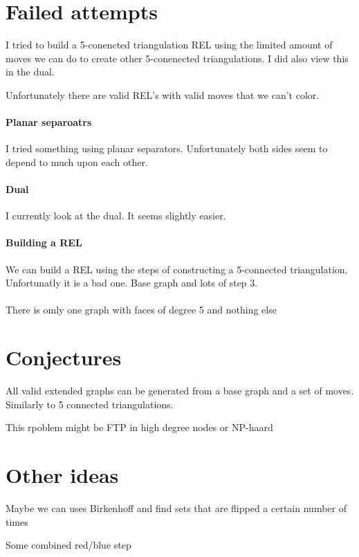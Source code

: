 \section{Failed attempts}
I tried to build a 5-conencted triangulation REL using the limited amount of moves we can do to create other 5-conenected triangulations. I did also view this in the dual.

Unfortunately there are valid REL's with valid moves that we can't color.

\paragraph{Planar separoatrs}
I tried something using planar separators. Unfortunately both sides seem to depend to much upon each other.

\paragraph{Dual}
I currently look at the dual. It seems slightly easier.

\paragraph{Building a REL}
We can build a REL using the steps of constructing a 5-connected triangulation. Unfortunatly it is a bad one.
Base graph and lots of step 3.


\paragraph{}
There is omly one graph with faces of degree 5 and nothing else


\section{Conjectures}
All valid extended graphs can be generated from a base graph and a set of moves. Similarly to 5 connected triangulations.

This rpoblem might be FTP in high degree nodes or NP-haard


\section{Other ideas}
Maybe we can uses Birkenhoff and find sets that are flipped a certain number of times

Some combined red/blue step

